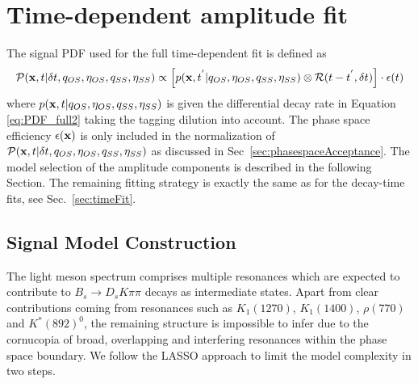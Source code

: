 \section{Time-dependent amplitude fit}
\label{sec:fullFit}

The signal PDF used for the full time-dependent fit is defined as
\begin{equation}
\label{eq:ampPDF_full}
\mathcal{P}(\mathbf{x}, t \vert\delta t, q_{OS}, \eta_{OS}, q_{SS}, \eta_{SS}) \propto \left[ p(\mathbf{x}, t^{'} \vert q_{OS}, \eta_{OS}, q_{SS}, \eta_{SS})  \otimes \mathcal{R}(t - t^{'},\delta t) \right] \cdot \epsilon(t)
\end{equation}
where $p(\mathbf{x}, t \vert q_{OS}, \eta_{OS}, q_{SS}, \eta_{SS})$ is given the differential decay rate in Equation \ref{eq:PDF_full2} taking the tagging dilution into account.
The phase space efficiency $\epsilon(\mathbf{x})$ is only included in the normalization of $\mathcal{P}(\mathbf{x}, t \vert\delta t, q_{OS}, \eta_{OS}, q_{SS}, \eta_{SS})$
as discussed in Sec~\ref{sec:phasespaceAcceptance}. 
The model selection of the amplitude components is described in the following Section.
The remaining fitting strategy is exactly the same as for the decay-time fits, see Sec.~\ref{sec:timeFit}.

\subsection{Signal Model Construction}
\label{sec:LASSO}

The light meson spectrum comprises multiple resonances which are expected to contribute to $B_s \to D_s K \pi \pi$  decays as intermediate states. 
Apart from clear contributions coming from resonances such as $K_{1}(1270)$, $K_{1}(1400)$, $\rho(770)$ and $K^*(892)^0$, 
the remaining structure is impossible to infer due to
the cornucopia of broad, overlapping and interfering resonances 
within the phase space boundary.
We follow the \textsf{LASSO} \cite{Tibshirani94regressionshrinkage,Guegan:2015mea} approach 
to limit the model complexity in two steps.

